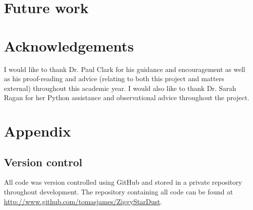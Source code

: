 \documentclass{report}
\begin{document}

\chapter{Future work}


\chapter*{Acknowledgements}
I would like to thank Dr. Paul Clark for his guidance and encouragement as well as his proof-reading and advice (relating to both this project and matters external) throughout this academic year. I would also like to thank Dr. Sarah Ragan for her Python assistance and observational advice throughout the project.


\chapter*{Appendix}

\section*{Version control}
All code was version controlled using GitHub and stored in a private repository throughout development. The repository containing all code can be found at \href{http://www.github.com/tomasjames/ZiggyStarDust}{http://www.github.com/tomasjames/ZiggyStarDust}.
\end{document}
